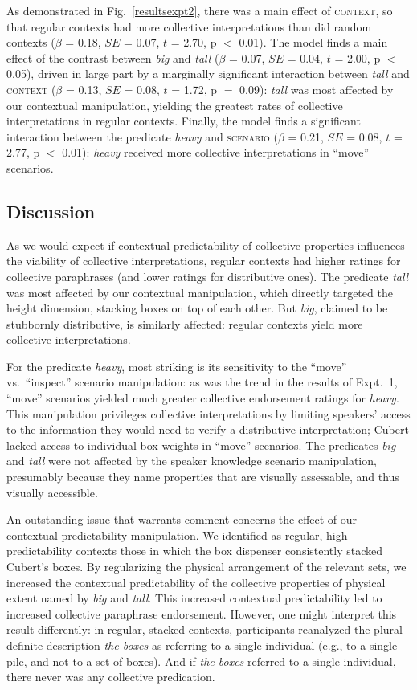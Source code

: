 \documentclass[linguex]{sp}
\begin{document}
As demonstrated in Fig.~\ref{resultsexpt2}, there was a main effect of \textsc{context}, so that regular contexts had more collective interpretations than did random contexts ($\beta$ = 0.18, $SE$ = 0.07, $t$ = 2.70, p $<$ 0.01). The model finds a main effect of the contrast between \emph{big} and \emph{tall} ($\beta$ = 0.07, $SE$ = 0.04, $t$ = 2.00, p $<$ 0.05), driven in large part by a marginally significant interaction between \emph{tall} and \textsc{context} ($\beta$ = 0.13, $SE$ = 0.08, $t$ = 1.72, p $=$ 0.09): \emph{tall} was most affected by our contextual manipulation, yielding the greatest rates of collective interpretations in regular contexts. Finally, the model finds a significant interaction between the predicate \emph{heavy} and \textsc{scenario} ($\beta$ = 0.21, $SE$ = 0.08, $t$ = 2.77, p $<$ 0.01): \emph{heavy} received more collective interpretations in ``move'' scenarios.

\subsection{Discussion}

As we would expect if contextual predictability of collective properties influences the viability of collective interpretations, regular contexts had higher ratings for collective paraphrases (and lower ratings for distributive ones). The predicate \textit{tall} was most affected by our contextual manipulation, which directly targeted the height dimension, stacking boxes on top of each other. But \emph{big}, claimed to be stubbornly distributive, is similarly affected: regular contexts yield more collective interpretations. 

For the predicate \emph{heavy}, most striking is its sensitivity to the ``move'' vs.~``inspect'' scenario manipulation: as was the trend in the results of Expt.~1, ``move'' scenarios yielded much greater collective endorsement ratings for \emph{heavy}. This manipulation privileges collective interpretations by limiting speakers' access to the information they would need to verify a distributive interpretation; Cubert lacked access to individual box weights in ``move'' scenarios. The predicates \emph{big} and \emph{tall} were not affected by the speaker knowledge scenario manipulation, presumably because they name properties that are visually assessable, and thus visually accessible.

An outstanding issue that warrants comment concerns the effect of our contextual predictability manipulation. We identified as regular, high-predictability contexts those in which the box dispenser consistently stacked Cubert's boxes. By regularizing the physical arrangement of the relevant sets, we increased the contextual predictability of the collective properties of physical extent named by \emph{big} and \emph{tall}. This increased contextual predictability led to increased collective paraphrase endorsement. However, one might interpret this result differently: in regular, stacked contexts, participants reanalyzed the plural definite description \emph{the boxes} as referring to a single individual (e.g., to a single pile, and not to a set of boxes). And if \emph{the boxes} referred to a single individual, there never was any collective predication.
\end{document}
